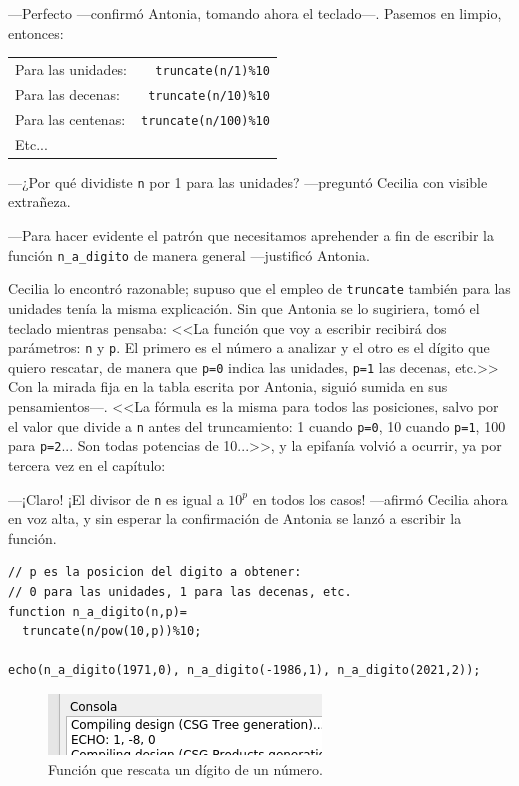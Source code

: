 ---Perfecto ---confirmó Antonia, tomando ahora el te\-cla\-do---.  Pasemos
en limpio, entonces:

\begin{tabular}{lr}
    Para las unidades:    & \lstinline!truncate(n/1)%10! \\
    Para las decenas:    & \lstinline!truncate(n/10)%10! \\
    Para las centenas:    & \lstinline!truncate(n/100)%10! \\
    Etc...
\end{tabular}
  
---¿Por qué dividiste \texttt{n} por 1 para las unidades?
---pre\-gun\-tó Cecilia con visible extrañeza.

---Para hacer evidente el patrón que necesitamos aprehender a fin de
escribir la función \lstinline!n_a_digito! de manera general
---jus\-ti\-fi\-có Antonia.

Cecilia lo encontró razonable; supuso que el empleo de
\texttt{truncate} también para las unidades tenía la misma
explicación. Sin que Antonia se lo sugiriera, tomó el teclado mientras
pensaba: <<La función que voy a escribir recibirá dos parámetros:
\texttt{n} y \texttt{p}. El primero es el número a analizar y el otro
es el dígito que quiero rescatar, de manera que \lstinline!p=0! indica
las unidades, \lstinline!p=1! las decenas, etc.>> Con la mirada fija
en la tabla escrita por Antonia, siguió sumida en sus
pensamientos---. <<La fórmula es la misma para todos las posiciones,
salvo por el valor que divide a \texttt{n} antes del truncamiento: 1
cuando \lstinline!p=0!, 10 cuando \lstinline!p=1!, 100 para
\lstinline!p=2!... Son todas potencias de 10...>>, y la epifanía
volvió a ocurrir, ya por tercera vez en el capítulo:

---¡Claro! ¡El divisor de \texttt{n} es igual a $10^p$ en todos los
casos! ---afirmó Cecilia ahora en voz alta, y sin esperar la
confirmación de Antonia se lanzó a escribir la función.

\begin{lstlisting}
// p es la posicion del digito a obtener: 
// 0 para las unidades, 1 para las decenas, etc.
function n_a_digito(n,p)= 
  truncate(n/pow(10,p))%10;

echo(n_a_digito(1971,0), n_a_digito(-1986,1), n_a_digito(2021,2));
\end{lstlisting}

\begin{figure}[ht]
  \centering
\includegraphics[width=.6\textwidth]{imagenes/n-a-digito-1}  
\caption[Función \lstinline!n_a_digito!.]{Función que rescata un
  dígito de un número.}
  \label{fig:n-a-digito-1}
\end{figure}


